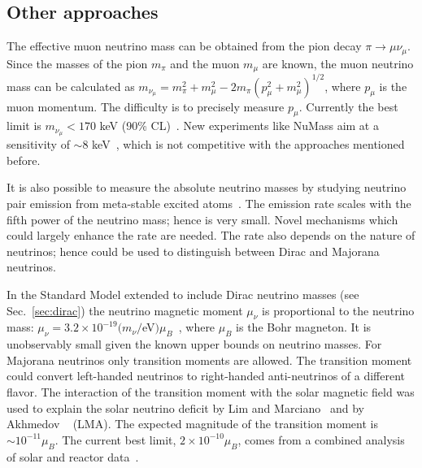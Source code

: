 \subsection{Other approaches}
\label{sec:otap}
The effective muon neutrino mass can be obtained from the pion decay $\pi \rightarrow \mu \nu_{\mu}$. Since the masses of the pion $m_{\pi}$ and the muon $m_{\mu}$ are known, the muon neutrino mass can be calculated as $m_{\nu_{\mu}} = m^{2}_{\pi} + m^{2}_{\mu} - 2m_{\pi} (p^{2}_{\mu} + m^{2}_{\mu})^{1/2}$, where $p_{\mu}$ is the muon momentum. The difficulty is to precisely measure $p_{\mu}$. Currently the best limit is $m_{\nu_{\mu}} < 170$ keV (90\% CL)~\cite{Ass96}. New experiments like NuMass aim at a sensitivity of $\sim 8$ keV~\cite{Num20}, which is not competitive with the approaches mentioned before.

It is also possible to measure the absolute neutrino masses by studying neutrino pair emission from meta-stable excited atoms~\cite{Yos07}. The emission rate scales with the fifth power of  the neutrino mass; hence is very small. Novel mechanisms which could largely enhance the rate are needed. The rate also depends on the nature of neutrinos; hence could be used to distinguish between Dirac and Majorana neutrinos.

In the Standard Model extended to include Dirac neutrino masses (see Sec.~\ref{sec:dirac}) the neutrino magnetic moment $\mu_{\nu}$ is proportional to the neutrino mass: $\mu_{\nu} = 3.2 \times 10^{-19}(m_{\nu}/$eV$)\mu_{B}$~\cite{Fuj80}, where $\mu_{B}$ is the Bohr magneton. It is unobservably small given the known upper bounds on neutrino masses. For Majorana neutrinos only transition moments are allowed. The transition moment could convert left-handed neutrinos to right-handed anti-neutrinos of a different flavor. The interaction of the transition moment with the solar magnetic field was used to explain the solar neutrino deficit by Lim and Marciano~\cite{Lim88} and by Akhmedov ~\cite{Akh88} (LMA). The expected magnitude of the transition moment is $\sim 10^{-11}\mu_{B}$. The current best limit, $2 \times 10^{-10}\mu_{B}$, comes from a combined analysis of solar and reactor data~\cite{Gri02}.

